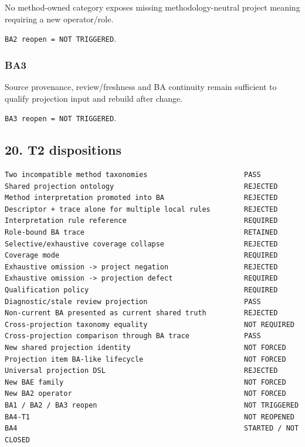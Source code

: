 \documentclass[11pt,a4paper]{article}
\begin{document}
No method-owned category exposes missing methodology-neutral project
meaning requiring a new operator/role.

\texttt{BA2\ reopen\ =\ NOT\ TRIGGERED}.

\subsubsection{BA3}\label{ba3}

Source provenance, review/freshness and BA continuity remain sufficient
to qualify projection input and rebuild after change.

\texttt{BA3\ reopen\ =\ NOT\ TRIGGERED}.

\subsection{20. T2 dispositions}\label{20-t2-dispositions}

\begin{verbatim}
Two incompatible method taxonomies                       PASS
Shared projection ontology                               REJECTED
Method interpretation promoted into BA                   REJECTED
Descriptor + trace alone for multiple local rules        REJECTED
Interpretation rule reference                            REQUIRED
Role-bound BA trace                                      RETAINED
Selective/exhaustive coverage collapse                   REJECTED
Coverage mode                                            REQUIRED
Exhaustive omission -> project negation                  REJECTED
Exhaustive omission -> projection defect                 REQUIRED
Qualification policy                                     REQUIRED
Diagnostic/stale review projection                       PASS
Non-current BA presented as current shared truth         REJECTED
Cross-projection taxonomy equality                       NOT REQUIRED
Cross-projection comparison through BA trace             PASS
New shared projection identity                           NOT FORCED
Projection item BA-like lifecycle                        NOT FORCED
Universal projection DSL                                 REJECTED
New BAE family                                           NOT FORCED
New BA2 operator                                         NOT FORCED
BA1 / BA2 / BA3 reopen                                   NOT TRIGGERED
BA4-T1                                                   NOT REOPENED
BA4                                                      STARTED / NOT CLOSED
\end{verbatim}
\end{document}
